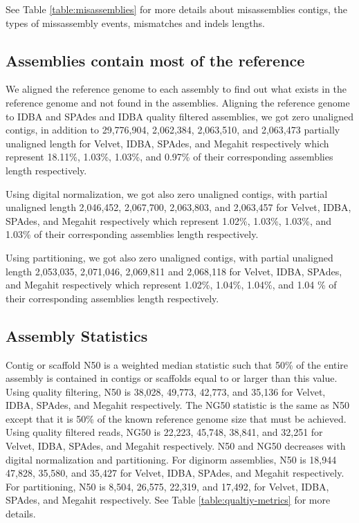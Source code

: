  
 See Table \ref{table:misassemblies}  for more details about misassemblies contigs, the types of missassembly events, mismatches and indels lengths.
   
\subsection*{Assemblies contain most of the reference} 
We aligned the reference genome to each assembly to find out what exists in the reference genome and not found in the assemblies. 
Aligning the reference genome to IDBA and SPAdes and IDBA quality filtered assemblies, we got zero unaligned contigs, in addition to 29,776,904, 2,062,384, 2,063,510, and 2,063,473 partially unaligned length for Velvet, IDBA, SPAdes, and Megahit respectively which represent 18.11\%, 1.03\%, 1.03\%, and 0.97\% of their corresponding assemblies length respectively. 


Using digital normalization, we got also zero unaligned contigs, with partial unaligned length 2,046,452, 2,067,700, 2,063,803, and 2,063,457 for Velvet, IDBA, SPAdes, and Megahit respectively which represent 1.02\%, 1.03\%, 1.03\%, and 1.03\% of their corresponding assemblies length respectively.


Using partitioning, we got also zero unaligned contigs, with partial unaligned length 2,053,035, 2,071,046, 2,069,811 and 2,068,118 for Velvet, IDBA, SPAdes, and Megahit respectively which represent 1.02\%, 1.04\%, 1.04\%, and 1.04 \% of their corresponding assemblies length respectively. 

\subsection*{Assembly Statistics}
Contig or scaffold N50 is a weighted median statistic such that 50\% of the entire assembly is contained in contigs or scaffolds equal to or larger than this value. Using quality filtering, N50 is 38,028, 49,773,  42,773, and 35,136 for Velvet, IDBA, SPAdes, and Megahit respectively. The NG50 statistic is the same as N50 except that it is 50\% of the known reference genome size that must be achieved. Using quality filtered reads,  NG50 is 22,223, 45,748, 38,841, and 32,251 for Velvet, IDBA, SPAdes, and Megahit respectively.  N50 and NG50 decreases with digital normalization and partitioning. For diginorm assemblies, N50 is 18,944 47,828, 35,580, and 35,427 for Velvet, IDBA, SPAdes, and Megahit respectively.  For partitioning, N50 is 8,504, 26,575, 22,319, and 17,492, for Velvet, IDBA, SPAdes, and Megahit respectively.  See Table \ref{table:qualtiy-metrics} for more details. 

